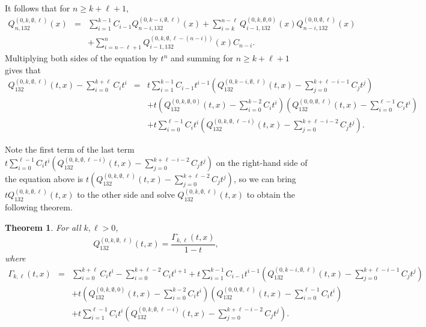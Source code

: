 \documentclass[
final,nomarks
]{dmtcs-episciences}
\newtheorem{theorem}{Theorem}
\newcommand{\Qmm}[1]{Q_{132}^{(#1)}(t,x)}
\newcommand{\Qmmn}[2]{Q_{#2,132}^{(#1)}(x)}
\begin{document}
It follows that for \begin{math}n \geq k+\ell+1\end{math}, 
\begin{eqnarray}
	\Qmmn{0,k,\emptyset,\ell}{n}&=&\sum_{i=1}^{k-1}C_{i-1}\Qmmn{0,k-i,\emptyset,\ell}{n-i}+\sum_{i=k}^{n-\ell}\Qmmn{0,k,\emptyset,0}{i-1}\Qmmn{0,0,\emptyset,\ell}{n-i}\nonumber\\
	&&+\sum_{i=n-\ell+1}^{n} \Qmmn{0,k,\emptyset,\ell-(n-i)}{i-1} C_{n-i}.
\end{eqnarray}
Multiplying both sides of the equation by \begin{math}t^n\end{math} and summing for \begin{math}n\geq k+\ell+1\end{math} gives that
\begin{eqnarray}
	\Qmm{0,k,\emptyset,\ell}-\sum_{i=0}^{k+\ell}C_i t^i&=&t\sum_{i=1}^{k-1}C_{i-1}t^{i-1}(\Qmm{0,k-i,\emptyset,\ell}-\sum_{j=0}^{k+\ell-i-1}C_j t^j)\nonumber\\\nonumber
	&&+t(\Qmm{0,k,\emptyset,0}-\sum_{i=0}^{k-2}C_i t^i)(\Qmm{0,0,\emptyset,\ell}-\sum_{i=0}^{\ell-1}C_i t^i)\\
	&&+t\sum_{i=0}^{\ell-1}C_it^i(\Qmm{0,k,\emptyset,\ell-i}-\sum_{j=0}^{k+\ell-i-2}C_j t^j).
\end{eqnarray}

Note the first term of the last term \begin{math}t\sum_{i=0}^{\ell-1}C_it^i(\Qmm{0,k,\emptyset,\ell-i}-\sum_{j=0}^{k+\ell-i-2}C_j t^j)\end{math} on the right-hand side of the equation above is \begin{math}t(\Qmm{0,k,\emptyset,\ell}-\sum_{j=0}^{k+\ell-2}C_j t^j)\end{math}, so we can bring \begin{math}t\Qmm{0,k,\emptyset,\ell}\end{math} to the other side and solve \begin{math}\Qmm{0,k,\emptyset,\ell}\end{math} to obtain the following theorem.
\begin{theorem}\label{theorem:8}
	For all \begin{math}k,\ell>0\end{math},
	\begin{equation}
	\Qmm{0,k,\emptyset,\ell}=\frac{\Gamma_{k,\ell}(t,x)}{1-t},
	\end{equation}	
	where
	\begin{eqnarray}
		\Gamma_{k,\ell}(t,x)&=&\nonumber
		\sum_{i=0}^{k+\ell}C_i t^i - \sum_{i=0}^{k+\ell-2}C_i t^{i+1}
		+t\sum_{i=1}^{k-1}C_{i-1}t^{i-1}(\Qmm{0,k-i,\emptyset,\ell}-\sum_{j=0}^{k+\ell-i-1}C_j t^j)\\\nonumber
		&&+t(\Qmm{0,k,\emptyset,0}-\sum_{i=0}^{k-2}C_i t^i)(\Qmm{0,0,\emptyset,\ell}-\sum_{i=0}^{\ell-1}C_i t^i)\\
		&&+t\sum_{i=1}^{\ell-1}C_it^i(\Qmm{0,k,\emptyset,\ell-i}-\sum_{j=0}^{k+\ell-i-2}C_j t^j).
	\end{eqnarray}
\end{theorem}
\end{document}
